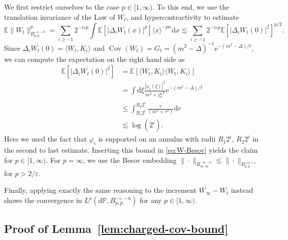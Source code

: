 \documentclass[11pt, a4paper]{scrartcl}
\numberwithin{equation}{section}
\theoremstyle{plain}
\theoremstyle{remark}
\newcommand{\mathd}{\mathrm{d}}
\newcommand{\mathe}{\mathrm{e}}
\newcommand{\tmop}[1]{\ensuremath{\operatorname{#1}}}
\begin{document}
We first restrict ourselves to the case $p \in [1, \infty)$. To this end, we
use the translation invariance of the Law of $W_t$, and hypercontractivity to
estimate
\begin{equation}
	\mathbb{E} \| W_t \|_{B^{- \varepsilon, - n}_{p, p}}^p = \sum_{i \geqslant -
		1} 2^{- i \varepsilon p} \int \mathbb{E} [| \Delta_i W_t (x) |^p] \langle x
	\rangle^{- pn} \mathd x \lesssim \sum_{i \geqslant - 1} 2^{- i \varepsilon
			p} \mathbb{E} [| \Delta_i W_t (0) |^2]^{p / 2} . \label{eq:W-Besov}
\end{equation}
Since $\Delta_i W_t (0) = \langle W_t, K_i \rangle$ and $\tmop{Cov} (W_t) =
	G_t = (m^2 - \Delta)^{- 1} \mathe^{- (m^2 - \Delta) / t}$, we can compute the
expectation on the right hand side as
\[ \begin{aligned}
		\mathbb{E} [| \Delta_i W_t (0) |^2] & = \mathbb{E} [\langle W_t, K_i
		\rangle \langle W_t, K_i \rangle]                                                                         \\
		                                    & = \int \mathd \xi \frac{| \varphi_i (\xi) |^2}{m^2 + | \xi |^2}
		\mathe^{- (m^2 - \Delta) / t}                                                                             \\
		                                    & \leqslant  \int_{R_1  2^i}^{R_2 2^i} \frac{r}{(m^2 + r^2)} \mathd r \\
		                                    & \lesssim  \log (2^i) .
	\end{aligned} \]
Here we used the fact that $\varphi_i$ is supported on an annulus with radii
$R_1 2^i$, $R_2 2^i$ in the second to last estimate. Inserting this bound in
\eqref{eq:W-Besov} yields the claim for $p \in [1, \infty) $. For $p =
	\infty$, we use the Besov embedding $\| \cdot \|_{B^{- \alpha, - n}_{\infty,
					\infty}} \lesssim \| \cdot \|_{B^{- \alpha + \varepsilon}_{p, p}}$ for $p > 2
	/ \varepsilon$.

Finally, applying exactly the same reasoning to the increment $W_{\infty} -
	W_t$ instead shows the convergence in $L^p (\mathd \mathbb{P}, B^{- \varepsilon, -
			n}_{p, p})$ for any $p \in [1, \infty)$.

\subsection{Proof of
	Lemma~\ref{lem:charged-cov-bound}}\label{app:charged-cov-bound}
\end{document}

